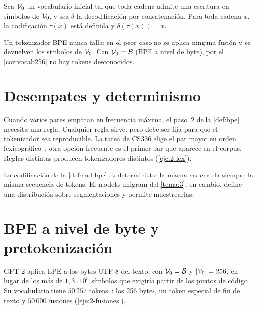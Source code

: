 \addtocounter{definicion}{1}%

\begin{teorema}\label{teo:bpe-correcto}
Sea $\mathcal{V}_0$ un vocabulario inicial tal que toda cadena admite una escritura en símbolos de $\mathcal{V}_0$, y sea $\delta$ la decodificación por concatenación. Para toda cadena $x$, la codificación $\tau(x)$ está definida y $\delta(\tau(x))=x$.
\end{teorema}

\begin{corolario}\label{cor:no-unk}
Un tokenizador BPE nunca falla: en el peor caso no se aplica ninguna fusión y se devuelven los símbolos de $\mathcal{V}_0$. Con $\mathcal{V}_0=\mathcal{B}$ (BPE a nivel de byte), por el \cref{cor:vocab256} no hay tokens desconocidos.
\end{corolario}

\section{Desempates y determinismo}

Cuando varios pares empatan en frecuencia máxima, el paso~2 de la \cref{def:bpe} necesita una regla. Cualquier regla sirve, pero debe ser fija para que el tokenizador sea reproducible. La tarea de CS336 elige el par mayor en orden lexicográfico~\cite[§2.4]{cs336}; otra opción frecuente es el primer par que aparece en el corpus. Reglas distintas producen tokenizadores distintos (\cref{eje:2-lex}).

\begin{observacion}
La codificación de la \cref{def:cod-bpe} es determinista: la misma cadena da siempre la misma secuencia de tokens. El modelo unigram del \cref{tema:3}, en cambio, define una distribución sobre segmentaciones y permite muestrearlas.
\end{observacion}

\section{BPE a nivel de byte y pretokenización}

GPT-2 aplica BPE a los bytes UTF-8 del texto, con $\mathcal{V}_0=\mathcal{B}$ y $\lvert\mathcal{V}_0\rvert=256$, en lugar de los más de $1{,}3\cdot 10^{5}$ símbolos que exigiría partir de los puntos de código~\cite[§2.2]{gpt2}. Su vocabulario tiene $50\,257$ tokens~\cite[§2.3]{gpt2}: los 256 bytes, un token especial de fin de texto y $50\,000$ fusiones (\cref{eje:2-fusiones}).

